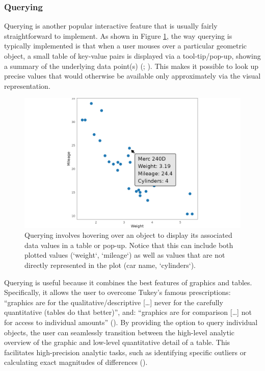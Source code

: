 \documentclass[
]{book}
\theoremstyle{definition}
\theoremstyle{definition}
\theoremstyle{definition}
\theoremstyle{definition}
\theoremstyle{remark}
\begin{document}
\subsubsection{Querying}\label{querying}

Querying is another popular interactive feature that is usually fairly straightforward to implement. As shown in Figure \ref{fig:querying}, the way querying is typically implemented is that when a user mouses over a particular geometric object, a small table of key-value pairs is displayed via a tool-tip/pop-up, showing a summary of the underlying data point(s) (; ). This makes it possible to look up precise values that would otherwise be available only approximately via the visual representation.

\begin{figure}

{\centering \includegraphics[width=1\linewidth,height=1\textheight]{./figures/querying} 

}

\caption{Querying involves hovering over an object to display its associated data values in a table or pop-up. Notice that this can include both plotted values (`weight`, `mileage`) as well as values that are not directly represented in the plot (car name, `cylinders`).}\label{fig:querying}
\end{figure}

Querying is useful because it combines the best features of graphics and tables. Specifically, it allows the user to overcome Tukey's famous prescriptions: ``graphics are for the qualitative/descriptive {[}\ldots{]} never for the carefully quantitative (tables do that better)'', and: ``graphics are for comparison {[}\ldots{]} not for access to individual amounts'' (). By providing the option to query individual objects, the user can seamlessly transition between the high-level analytic overview of the graphic and low-level quantitative detail of a table. This facilitates high-precision analytic tasks, such as identifying specific outliers or calculating exact magnitudes of differences ().
\end{document}
